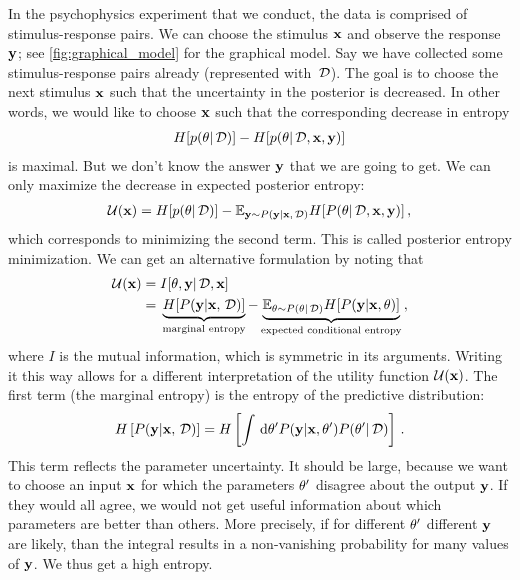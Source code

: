 In the psychophysics experiment that we conduct, the data is comprised of stimulus-response pairs. We can choose the stimulus ${\bf x}$ and observe the response ${\bf y}$; see \cref{fig:graphical_model} for the graphical model. Say we have collected some stimulus-response pairs already (represented with $\,\mathcal{D}$). The goal is to choose the next stimulus ${\bf x}$ such that the uncertainty in the posterior is decreased. In other words, we would like to choose ${\bf x}$ such that the corresponding decrease in entropy
\begin{align}
	H[p(\theta | \,\mathcal{D})] - H[p(\theta | \,\mathcal{D}, {\bf x}, {\bf y})]
\end{align}
is maximal. But we don't know the answer ${\bf y}$ that we are going to get. We can only maximize the decrease in expected posterior entropy:
\begin{align}
	\mathcal{U}({\bf x})
	= H[p(\theta | \,\mathcal{D})]
	- \mathbb{E}_{{\bf y} \sim {P({\bf y}| {\bf x}, \,\mathcal{D})}} H[{P(\theta | \,\mathcal{D}, {\bf x}, {\bf y})}] \,,
\end{align}
which corresponds to minimizing the second term. This is called posterior entropy minimization.
We can get an alternative formulation by noting that
\begin{align}
	\mathcal{U}({\bf x})
	&= I[\theta, {\bf y} | \,\mathcal{D}, {\bf x}] \\
	&={}
	\underbrace{
	H[{P({\bf y} | {\bf x}, \,\mathcal{D})}]}_{\text{marginal entropy}}
	-
	\underbrace{
	\mathbb{E}_{\theta \sim {P(\theta| \,\mathcal{D})}} H[{P({\bf y} | {\bf x}, \theta)}]}_{\text{expected conditional entropy}}
	\,,
\end{align}
where $I$ is the mutual information, which is symmetric in its arguments. Writing it this way allows for a different interpretation of the utility function $\mathcal{U}({\bf x})$.
The first term (the marginal entropy) is the entropy of the predictive distribution:
\begin{align}
	H\left[{P({\bf y} | {\bf x}, \,\mathcal{D})}\right] = H\left[\int \,\mathrm{d} \theta' {P({\bf y} | {\bf x}, \theta')} {P(\theta' | \,\mathcal{D})}\right] \,.
\end{align}
This term reflects the parameter uncertainty.
It should be large, because we want to choose an input ${\bf x}$ for which the parameters $\theta'$ disagree about the output ${\bf y}$. If they would all agree, we would not get useful information about which parameters are better than others.
More precisely, if for different $\theta'$ different ${\bf y}$ are likely, than the integral results in a non-vanishing probability for many values of ${\bf y}$. We thus get a high entropy.

